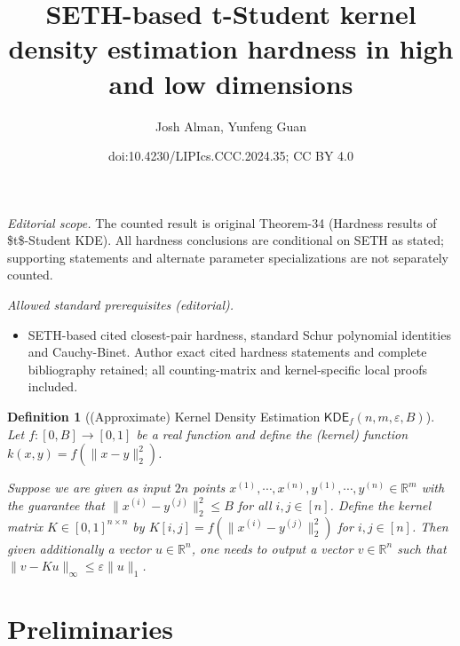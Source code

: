 \documentclass[10pt,a4paper]{article}
\title{SETH-based t-Student kernel density estimation hardness in high and low dimensions}
\author{Josh Alman, Yunfeng Guan}
\date{doi:10.4230/LIPIcs.CCC.2024.35; CC BY 4.0}
\newtheorem{definition}[theorem]{Definition}
\theoremstyle{remark}
\numberwithin{equation}{section}
\numberwithin{theorem}{section}
\newcommand{\R}{\ensuremath{\mathbb{R}}}
\newcommand{\eps}{\varepsilon}
\begin{document}
\maketitle
\setcounter{section}{1}
\noindent\textit{Editorial scope.} The counted result is original Theorem-34 (Hardness results of \$t\$-Student KDE). All hardness conclusions are conditional on SETH as stated; supporting statements and alternate parameter specializations are not separately counted.\par\medskip
\noindent\textit{Allowed standard prerequisites (editorial).}\begin{itemize}
\item SETH-based cited closest-pair hardness, standard Schur polynomial identities and Cauchy-Binet. Author exact cited hardness statements and complete bibliography retained; all counting-matrix and kernel-specific local proofs included.
\end{itemize}\medskip
\begin{definition}[(Approximate) Kernel Density Estimation $\mathsf{KDE}_f(n, m, \eps, B)$]
Let $f: [0, B] \rightarrow [0, 1]$ be a real function and define the (kernel) function $k(x, y) = f(\|x-y\|_2^2)$.

Suppose we are given as input $2n$ points $x^{(1)}, \cdots, x^{(n)}, y^{(1)}, \cdots, y^{(n)} \in \R^m$ with the guarantee that $\|x^{(i)} - y^{(j)}\|_2^2 \le B$ for all $i, j \in [n]$.
Define the kernel matrix $K \in [0,1]^{n \times n}$ by $K[i, j] = f(\|x^{(i)}- y^{(j)}\|_2^2)$ for $i, j \in [n]$.
Then given additionally a vector $u \in \R^n$, one needs to output a vector $v \in \R^n$ such that
$\|v - K u\|_{\infty} \le \eps\|u\|_{1}$.
\end{definition}

\section{Preliminaries}
\end{document}
